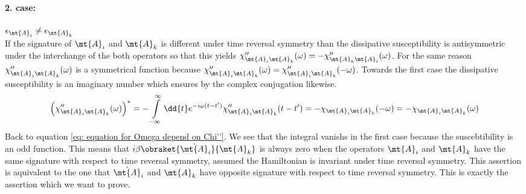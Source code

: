 \paragraph{2. case:} $\epsilon_{\mt{A}_{i}} \neq \epsilon_{\mt{A}_{k}}$\\
%
If the signature of $\mt{A}_{i}$ and $\mt{A}_{k}$ is different under time reversal symmetry than the dissipative susceptibility is antisymmetric under the interchange of the both operators so that this yields $\chi''_{\mt{A}_{i} \mt{A}_{k}}(\omega) = -\chi''_{\mt{A}_{k} \mt{A}_{i}}(\omega)$.
For the same reason $\chi''_{\mt{A}_{i} \mt{A}_{k}}(\omega)$ is a symmetrical function because $\chi''_{\mt{A}_{i} \mt{A}_{k}}(\omega) = \chi''_{\mt{A}_{i} \mt{A}_{k}}(-\omega)$.
Towards the first case the dissipative susceptibility is an imaginary number which ensures by the complex conjugation likewise.
%
\begin{align}
	\Big(\chi''_{\mt{A}_{i} \mt{A}_{k}}(\omega)\Big)^{*} = -\int\limits_{-\infty}^{\infty} \dd{t} e^{-i\omega(t-t')} \chi''_{\mt{A}_{i} \mt{A}_{k}}(t-t') = -\chi_{\mt{A}_{i} \mt{A}_{k}}(-\omega) = -\chi_{\mt{A}_{i} \mt{A}_{k}}(\omega)
\end{align}
%
Back to equation \eqref{eq: equation for Omega depend on Chi''}.
We see that the integral vanishs in the first case because the suscebtibility is an odd function.
This means that $i \beta \obraket{\dot{\mt{A}}_{i}}{\mt{A}_{k}}$ is always zero when the operators $\mt{A}_{i}$ and $\mt{A}_{k}$ have the same signature with respect to time reversal symmetry, assumed the Hamiltonian is invariant under time reversal symmetry.
This assertion is aquivalent to the one that $\dot{\mt{A}}_{i}$ and $\mt{A}_{k}$ have opposite signature with respect to time reversal symmetry.
This is exactly the assertion which we want to prove.






































